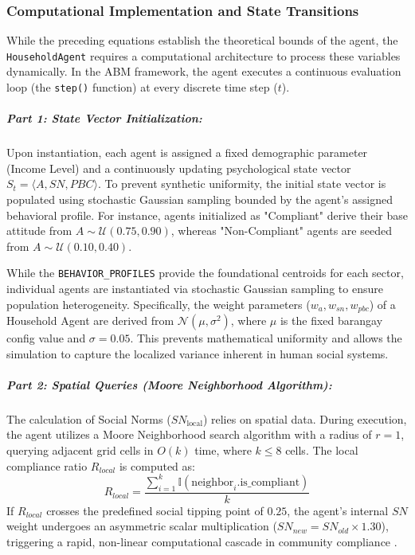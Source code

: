 \subsubsection{Computational Implementation and State Transitions}

While the preceding equations establish the theoretical bounds of the agent, the \texttt{HouseholdAgent} requires a computational architecture to process these variables dynamically. In the ABM framework, the agent executes a continuous evaluation loop (the \texttt{step()} function) at every discrete time step ($t$). 

\subparagraph{Part 1: State Vector Initialization:} 
Upon instantiation, each agent is assigned a fixed demographic parameter (Income Level) and a continuously updating psychological state vector $S_{t} = \langle A, SN, PBC \rangle$. To prevent synthetic uniformity, the initial state vector is populated using stochastic Gaussian sampling bounded by the agent's assigned behavioral profile. For instance, agents initialized as "Compliant" derive their base attitude from $A \sim \mathcal{U}(0.75, 0.90)$, whereas "Non-Compliant" agents are seeded from $A \sim \mathcal{U}(0.10, 0.40)$.

While the \texttt{BEHAVIOR\_PROFILES} provide the foundational centroids for each sector, individual agents are instantiated via stochastic Gaussian sampling to ensure population heterogeneity. Specifically, the weight parameters ($w_a, w_{sn}, w_{pbc}$) of a Household Agent are derived from $\mathcal{N}(\mu, \sigma^2)$, where $\mu$ is the fixed barangay config value and $\sigma = 0.05$. This prevents mathematical uniformity and allows the simulation to capture the localized variance inherent in human social systems.

\subparagraph{Part 2: Spatial Queries (Moore Neighborhood Algorithm):} 
The calculation of Social Norms ($SN_{\mathrm{local}}$) relies on spatial data. During execution, the agent utilizes a Moore Neighborhood search algorithm with a radius of $r=1$, querying adjacent grid cells in $O(k)$ time, where $k \le 8$ cells. The local compliance ratio $R_{local}$ is computed as:
\begin{equation}
    R_{local} = \frac{\sum_{i=1}^{k} \mathbb{I}(\text{neighbor}_i.\text{is\_compliant})}{k}
\end{equation}
If $R_{local}$ crosses the predefined social tipping point of $0.25$, the agent's internal $SN$ weight undergoes an asymmetric scalar multiplication ($SN_{new} = SN_{old} \times 1.30$), triggering a rapid, non-linear computational cascade in community compliance \citep{Centola2018}.


